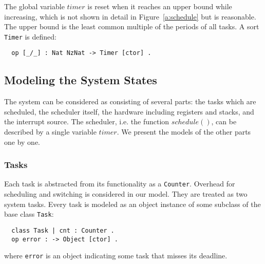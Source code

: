 \documentclass[10pt,journal]{IEEEtran}
\newcommand{\hide}[1]{\ignorespaces}
\begin{document}
\hide{
At last, to make our model checkable by untimed model checking, it is
reasonable to reset the global variable $timer$ when it reaches an
upper bound while increasing (see Line~\ref{l:timer} in
Figure~\ref{a:schedule}) in the model. Then $timer$ is of sort
\verb|Timer| and the upper bound would be the least common multiple of
the periods of all tasks.}

The global variable $timer$ is reset when it reaches an upper bound
while increasing, which is not shown in detail in
Figure~\ref{a:schedule} but is reasonable. The upper bound is the
least common multiple of the periods of all tasks. A sort \verb|Timer|
is defined:
\begin{verbatim}
  op [_/_] : Nat NzNat -> Timer [ctor] .
\end{verbatim}

\subsection{Modeling the System States}
The system can be considered as consisting of several parts: the tasks
which are scheduled, the scheduler itself, the hardware including
registers and stacks, and the interrupt source. The scheduler,
i.e. the function $schedule()$, can be described by a single variable
$timer$. We present the models of the other parts one by one.

\subsubsection{Tasks}
Each task is abstracted from its functionality as a \verb|Counter|.
Overhead for scheduling and switching is considered in our model. They
are treated as two system tasks. Every task is modeled as an object
instance of some subclass of the base class \verb|Task|:
\begin{verbatim}
  class Task | cnt : Counter .
  op error : -> Object [ctor] .
\end{verbatim}
where \verb|error| is an object indicating some task that misses its
deadline.
\end{document}
